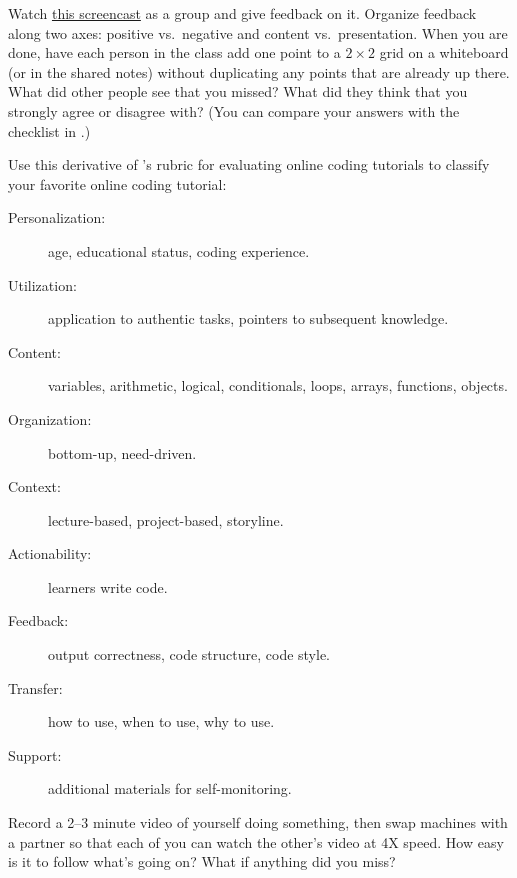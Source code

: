
Watch \href{https://youtu.be/xcnoHaxXvdQ}{this screencast} as a group
and give feedback on it. Organize feedback along two axes: positive
vs.\ negative and content vs.~presentation.  When you are done, have
each person in the class add one point to a $2{\times}2$ grid on a
whiteboard (or in the shared notes) without duplicating any points
that are already up there.  What did other people see that you missed?
What did they think that you strongly agree or disagree with?  (You
can compare your answers with the checklist in .)


Use this derivative of \cite{Kim2017}'s rubric for evaluating online
coding tutorials to classify your favorite online coding tutorial:

\begin{description}

  \item[Personalization:] age, educational status, coding experience.

  \item[Utilization:] application to authentic tasks, pointers to
    subsequent knowledge.

  \item[Content:] variables, arithmetic, logical, conditionals, loops,
    arrays, functions, objects.

  \item[Organization:] bottom-up, need-driven.

  \item[Context:] lecture-based, project-based, storyline.

  \item[Actionability:] learners write code.

  \item[Feedback:] output correctness, code structure, code style.

  \item[Transfer:] how to use, when to use, why to use.

  \item[Support:] additional materials for self-monitoring.

\end{description}


Record a 2--3 minute video of yourself doing something, then swap
machines with a partner so that each of you can watch the other's
video at 4X speed.  How easy is it to follow what's going on?  What if
anything did you miss?


